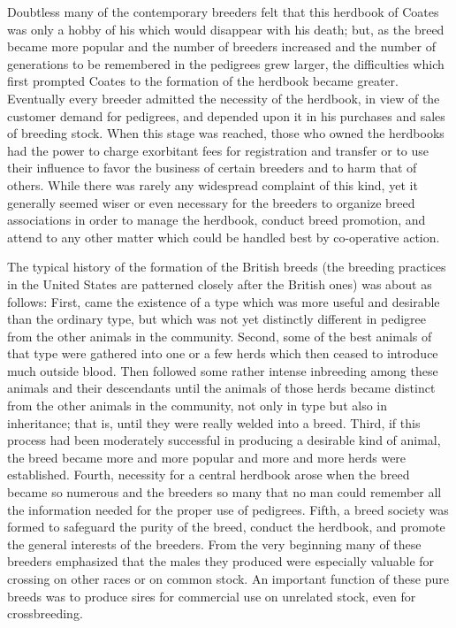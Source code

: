 Doubtless many of the contemporary breeders felt that this herdbook of Coates was only a hobby of his which would disappear 
with his death; but, as the breed became more popular and the number of breeders increased and the number of generations to 
be remembered in the pedigrees grew larger, the difficulties which first prompted Coates to the formation of the herdbook 
became greater. Eventually every breeder admitted the necessity of the herdbook, in view of the customer demand for 
pedigrees, and depended upon it in his purchases and sales of breeding stock. When this stage was reached, those who owned 
the herdbooks had the power to charge exorbitant fees for registration and transfer or to use their influence to favor the 
business of certain breeders and to harm that of others. While there was rarely any widespread complaint of this kind, yet 
it generally seemed wiser or even necessary for the breeders to organize breed associations in order to manage the 
herdbook, conduct breed promotion, and attend to any other matter which could be handled best by co-operative action. 

The typical history of the formation of the British breeds (the breeding practices in the United States are patterned 
closely after the British ones) was about as follows: First, came the existence of a type which was more useful and 
desirable than the ordinary type, but which was not yet distinctly different in pedigree from the other animals in the 
community. Second, some of the best animals of that type were gathered into one or a few herds which then ceased to 
introduce much outside blood. Then followed some rather intense inbreeding among these animals and their descendants until 
the animals of those herds became distinct from the other animals in the community, not only in type but also in 
inheritance; that is, until they were really welded into a breed. Third, if this process had been moderately successful in 
producing a desirable kind of animal, the breed became more and more popular and more and more herds were established. 
Fourth, necessity for a central herdbook arose when the breed became so numerous and the breeders so many that no man could 
remember all the information needed for the proper use of pedigrees. Fifth, a breed society was formed to safeguard the 
purity of the breed, conduct the herdbook, and promote the general interests of the breeders. From the very beginning many 
of these breeders emphasized that the males they produced were especially valuable for crossing on other races or on common 
stock. An important function of these pure breeds was to produce sires for commercial use on unrelated stock, even for 
crossbreeding. 

